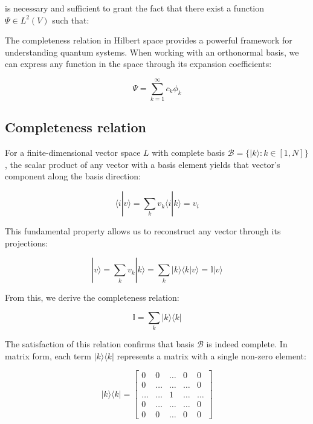 \documentclass[italian]{HKNdocument}
\begin{document}
is necessary and sufficient to grant the fact that there exist a function $\Psi \in L^2(V)$ such that:


The completeness relation in Hilbert space provides a powerful framework for understanding quantum systems. When working with an orthonormal basis, we can express any function in the space through its expansion coefficients:

\begin{equation}
\Psi = \sum_{k=1}^{\infty} c_k\phi_k
\end{equation}

\subsection{Completeness relation}

For a finite-dimensional vector space $L$ with complete basis $\mathcal{B} = \{|k\rangle: k \in [1,N]\}$, the scalar product of any vector with a basis element yields that vector's component along the basis direction:

\begin{equation}
\langle i|v\rangle = \sum_k v_k\langle i|k\rangle = v_i
\end{equation}

This fundamental property allows us to reconstruct any vector through its projections:

\begin{equation}
|v\rangle = \sum_k v_k|k\rangle = \sum_k |k\rangle\langle k|v\rangle = \mathbb{I}|v\rangle
\end{equation}

From this, we derive the completeness relation:

\begin{equation}
\mathbb{I} = \sum_k |k\rangle\langle k|
\end{equation}

The satisfaction of this relation confirms that basis $\mathcal{B}$ is indeed complete. In matrix form, each term $|k\rangle\langle k|$ represents a matrix with a single non-zero element:

\[
|k\rangle\langle k| = \begin{bmatrix}
0 & 0 & \ldots & 0 & 0 \\
0 & \ldots & \ldots & \ldots & 0 \\
\ldots & \ldots & 1 & \ldots & \ldots \\
0 & \ldots & \ldots & \ldots & 0 \\
0 & 0 & \ldots & 0 & 0
\end{bmatrix}
\]
\end{document}
